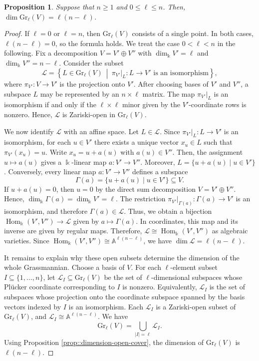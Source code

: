 \documentclass[a4,12pt]{amsart}
\numberwithin{equation}{section} %
\def\Hom{\operatorname{Hom}} %
\def\Gr{\mathrm{Gr}} %
\newtheorem{proposition}[theorem]{Proposition} %
\theoremstyle{definition} %
\begin{document}
\begin{proposition}\label{prop::grassmannian-dimension}
Suppose that $n\geq 1$ and $0\leq \ell\leq n$. Then, $\dim \Gr_\ell(V)=\ell(n-\ell)$.
\end{proposition}
\begin{proof}
If $\ell=0$ or $\ell=n$, then $\Gr_\ell(V)$ consists of a single point. In both cases, $\ell(n-\ell)=0$, so the formula holds. We treat the case $0<\ell<n$ in the following. Fix a decomposition $V=V'\oplus V''$ with $\dim_{\Bbbk}V' =\ell$ and $\dim_{\Bbbk} V''=n-\ell$. Consider the subset
\[
\mathcal{L} =\left\{
L\in \Gr_\ell(V)
\ \middle|\
\pi_{V'}|_L\colon L\to V'\text{ is an isomorphism}
\right\},
\]
where $\pi_{V'}\colon V\to V'$ is the projection onto $V'$. After choosing bases of $V'$ and $V''$, a subspace $L$ may be represented by an $n\times \ell$ matrix. The map $\pi_{V'}|_L$ is an isomorphism if and only if the $\ell\times\ell$ minor given by the $V'$-coordinate rows is nonzero. Hence, $\mathcal{L}$ is Zariski-open in $\Gr_\ell(V)$. 

We now identify $\mathcal{L}$ with an affine space. Let $L\in \mathcal{L}$. Since $\pi_{V'}|_L\colon L\to V'$ is an isomorphism, for each $u\in V'$ there exists a unique vector $x_u\in L$ such that $\pi_{V'}(x_u)=u$. Write $x_u=u+a(u)$ with $a(u)\in V''$. Then, the assignment $u\mapsto a(u)$ gives a $\Bbbk$-linear map $a\colon V' \to V''$. Moreover, $L=\{u+a(u)\mid u\in V'\}$. Conversely, every linear map $a\colon V' \to V''$ defines a subspace
\[
\Gamma(a)=\{u+a(u)\mid u\in V'\}\subseteq V.
\]
If $u+a(u)=0$, then $u=0$ by the direct sum decomposition $V=V'\oplus V''$. Hence, $\dim_{\Bbbk} \Gamma(a)=\dim_{\Bbbk} V'=\ell$. The restriction $\pi_{V'}|_{\Gamma(a)}\colon \Gamma(a)\to V'$ is an isomorphism, and therefore $\Gamma(a)\in \mathcal{L}$. Thus, we obtain a bijection $\Hom_{\Bbbk}(V',V'') \rightarrow \mathcal{L}$ given by $a\mapsto \Gamma(a)$. In coordinates, this map and its inverse are given by regular maps. Therefore, $\mathcal{L}\cong \Hom_{\Bbbk}(V',V'')$ as algebraic varieties. Since $\Hom_{\Bbbk}(V',V'')\cong \mathbb{A}^{\ell(n-\ell)}$, we have $\dim\mathcal{L}=\ell(n-\ell)$. 

It remains to explain why these open subsets determine the dimension of the whole Grassmannian. Choose a basis of $V$. For each $\ell$-element subset $I\subseteq \{1,\ldots,n\}$, let $\mathcal{L}_I\subseteq \Gr_\ell(V)$ be the set of $\ell$-dimensional subspaces whose Pl\"ucker coordinate corresponding to $I$ is nonzero. Equivalently, $\mathcal{L}_I$ is the set of subspaces whose projection onto the coordinate subspace spanned by the basis vectors indexed by $I$ is an isomorphism. Each $\mathcal{L}_I$ is a Zariski-open subset of $\Gr_\ell(V)$, and $\mathcal{L}_I\cong \mathbb{A}^{\ell(n-\ell)}$. We have
\[
\Gr_\ell(V)=\bigcup_{|I|=\ell}\mathcal{L}_I.
\]
Using Proposition \ref{prop::dimension-open-cover}, the dimension of $\Gr_\ell(V)$ is $\ell(n-\ell)$. 
\end{proof}
\end{document}
